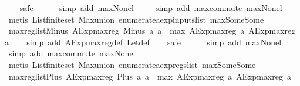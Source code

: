 \begin{isabellebody}
\ \ \isamarkupfalse%
\ safe\isanewline
\ \ \ \ \isamarkupfalse%
\ {\isacharparenleft}simp\ add{\isacharcolon}\ max{\isacharunderscore}None{\isacharunderscore}l{\isacharparenright}\isanewline
\ \ \ \isamarkupfalse%
\ {\isacharparenleft}simp\ add{\isacharcolon}\ max{\isachardot}commute\ max{\isacharunderscore}None{\isacharunderscore}l{\isacharparenright}\isanewline
\ \ \isamarkupfalse%
\ {\isacharparenleft}metis\ List{\isachardot}finite{\isacharunderscore}set\ Max{\isachardot}union\ enumerate{\isacharunderscore}aexp{\isacharunderscore}inputs{\isacharunderscore}list\ max{\isacharunderscore}Some{\isacharunderscore}Some{\isacharparenright}%
\endisatagproof
{\isafoldproof}%
%
\isadelimproof
\isanewline
%
\endisadelimproof
\isanewline
{}\isamarkupfalse%
\ max{\isacharunderscore}reg{\isacharunderscore}list{\isacharunderscore}Minus{\isacharcolon}\ {\isachardoublequoteopen}AExp{\isachardot}max{\isacharunderscore}reg\ {\isacharparenleft}Minus\ a{}\ a{}{\isacharparenright}\ {\isacharequal}\ max\ {\isacharparenleft}AExp{\isachardot}max{\isacharunderscore}reg\ a{}{\isacharparenright}\ {\isacharparenleft}AExp{\isachardot}max{\isacharunderscore}reg\ a{}{\isacharparenright}{\isachardoublequoteclose}\isanewline
%
\isadelimproof
\ \ %
\endisadelimproof
%
\isatagproof
{}\isamarkupfalse%
\ {\isacharparenleft}simp\ add{\isacharcolon}\ AExp{\isachardot}max{\isacharunderscore}reg{\isacharunderscore}def\ Let{\isacharunderscore}def{\isacharparenright}\isanewline
\ \ \isamarkupfalse%
\ safe\isanewline
\ \ \ \ \isamarkupfalse%
\ {\isacharparenleft}simp\ add{\isacharcolon}\ max{\isacharunderscore}None{\isacharunderscore}l{\isacharparenright}\isanewline
\ \ \ \isamarkupfalse%
\ {\isacharparenleft}simp\ add{\isacharcolon}\ max{\isachardot}commute\ max{\isacharunderscore}None{\isacharunderscore}l{\isacharparenright}\isanewline
\ \ \isamarkupfalse%
\ {\isacharparenleft}metis\ List{\isachardot}finite{\isacharunderscore}set\ Max{\isachardot}union\ enumerate{\isacharunderscore}aexp{\isacharunderscore}regs{\isacharunderscore}list\ max{\isacharunderscore}Some{\isacharunderscore}Some{\isacharparenright}%
\endisatagproof
{\isafoldproof}%
%
\isadelimproof
\isanewline
%
\endisadelimproof
\isanewline
{}\isamarkupfalse%
\ max{\isacharunderscore}reg{\isacharunderscore}list{\isacharunderscore}Plus{\isacharcolon}\ {\isachardoublequoteopen}AExp{\isachardot}max{\isacharunderscore}reg\ {\isacharparenleft}Plus\ a{}\ a{}{\isacharparenright}\ {\isacharequal}\ max\ {\isacharparenleft}AExp{\isachardot}max{\isacharunderscore}reg\ a{}{\isacharparenright}\ {\isacharparenleft}AExp{\isachardot}max{\isacharunderscore}reg\ a{}{\isacharparenright}{\isachardoublequoteclose}\isanewline

\end{isabellebody}
